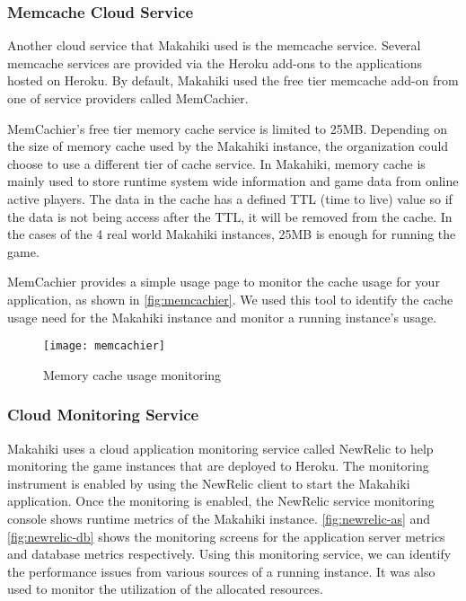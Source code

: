 \subsubsection{Memcache Cloud Service}

Another cloud service that Makahiki used is the memcache service. Several memcache services are provided via the Heroku add-ons to the applications hosted on Heroku. By default, Makahiki used the free tier memcache add-on from one of service providers called MemCachier\cite{memcachier}. 

MemCachier's free tier memory cache service is limited to 25MB. Depending on the size of memory cache used by the Makahiki instance, the organization could choose to use a different tier of cache service. In Makahiki, memory cache is mainly used to store  runtime system wide information and game data from online active players. The data in the cache has a defined TTL (time to live) value so if the data is not being access after the TTL, it will be removed from the cache. In the cases of the 4 real world Makahiki instances, 25MB is enough for running the game.

MemCachier provides a simple usage page to monitor the cache usage for your application, as shown in \autoref{fig:memcachier}. We used this tool to identify the cache usage need for the Makahiki instance and monitor a running instance's usage.

\begin{figure}[ht!]
  \center
  \texttt{[image: memcachier]}
  \caption{Memory cache usage monitoring}
  \label{fig:memcachier}
\end{figure}

\subsubsection{Cloud Monitoring Service}

Makahiki uses a cloud application monitoring service called NewRelic to help monitoring the game instances that are deployed to Heroku. The monitoring instrument is enabled by using the NewRelic client to start the Makahiki application. Once the monitoring is enabled, the NewRelic service monitoring console shows runtime metrics of the Makahiki instance. \autoref{fig:newrelic-as} and \autoref{fig:newrelic-db} shows the monitoring screens for the application server metrics and database metrics respectively. Using this monitoring service, we can identify the performance issues from various sources of a running instance. It was also used to monitor the utilization of the allocated resources.

